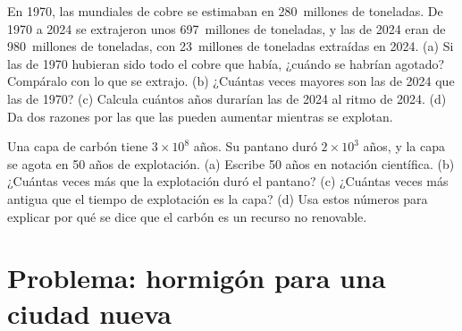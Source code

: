 \begin{exercise}[$\star\star\star$]\label{exo:g9:earth-resources:11}
En 1970, las  mundiales de cobre se estimaban en 280~millones de
toneladas. De 1970 a 2024 se extrajeron unos 697~millones de toneladas, y
las  de 2024 eran de 980~millones de toneladas, con 23~millones de
toneladas extraídas en 2024. (a) Si las  de 1970 hubieran sido
todo el cobre que había, ¿cuándo se habrían agotado? Compáralo con lo que
se extrajo. (b) ¿Cuántas veces mayores son las  de 2024 que las de
1970? (c) Calcula cuántos años durarían las  de 2024 al ritmo de
2024. (d) Da dos razones por las que las  pueden aumentar mientras
se explotan.
\end{exercise}

\begin{exercise}[$\star\star\star$]\label{exo:g9:earth-resources:12}
Una capa de carbón tiene $3 \times 10^8$ años. Su pantano duró $2 \times 10^3$
años, y la capa se agota en 50 años de explotación. (a) Escribe 50 años en
notación científica. (b) ¿Cuántas veces más que la explotación duró el
pantano? (c) ¿Cuántas veces más antigua que el tiempo de explotación es la
capa? (d) Usa estos números para explicar por qué se dice que el carbón es
un recurso no renovable.
\end{exercise}

\section{Problema: hormigón para una ciudad nueva}

